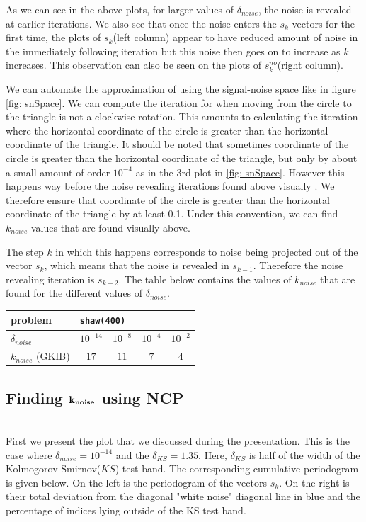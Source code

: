 \documentclass[11pt]{amsart}
\begin{document}
	
	As we can see in the above plots, for larger values of $\delta_{noise}$, the
	noise is revealed at earlier iterations. We also see that once the noise enters
	the $s_k$ vectors for the first time, the plots of $s_k$(left column) appear to have 
	reduced amount of noise in the immediately following iteration but this 
	noise then goes on to increase as $k$ increases. This observation can also be seen on the
	plots of $s_{k}^{no}$(right column).
	
We can automate the approximation of using the signal-noise space like in figure \ref{fig: snSpace}.
We can compute the iteration for when moving from the circle to the triangle is not a clockwise
rotation. This amounts to calculating the iteration where the horizontal coordinate of the circle is greater
than the horizontal coordinate of the triangle. It should be noted that sometimes coordinate of the 
circle is greater than the horizontal coordinate of the triangle, but only by about a small  amount of 
order $10^{-4}$ as in the 3rd plot in \ref{fig: snSpace}.
However this happens way before the noise revealing iterations found above visually . We therefore
ensure that coordinate of the circle is greater than the horizontal coordinate of the triangle by at least 0.1. 
Under this convention, we can find $k_{noise}$ values that are found visually above.

The step $k$ in which this happens corresponds to noise being projected out of the vector $s_k$,
which means that the noise is revealed in $s_{k-1}$. Therefore the noise revealing iteration 
is $s_{k-2}$. The table below contains the values of $k_{noise}$ that are found for the different 
values of $\delta_{noise}$.

\begin{center}
    \begin{tabular}{l||c|c|c|c}
      \multicolumn{1}{l||}{problem} & \multicolumn{4}{l}{\texttt{shaw(400)}} \\
      \hline \hline 
      $\delta_{noise}$ & $10^{-14}$ & $10^{-8}$ & $10^{-4}$ & $10^{-2}$ \\
      \hline
      $k_{noise}$ (GKIB) & $17$ & $11$ & $7$ & $4$ \\
          \end{tabular}
  \end{center}

\subsection{Finding $\bf k_{noise}$ using NCP} \indent \\
First we present the plot that we discussed during the presentation. This is the case where
$\delta_{noise} = 10^{-14}$  and the $\delta_{KS}=1.35$. Here, $\delta_{KS}$ is half of the
width of the Kolmogorov-Smirnov($KS$) test band. The corresponding cumulative periodogram is given below. 
On the left is the periodogram of the vectors $s_k$. On the right is their total deviation from 
the diagonal "white noise" diagonal line in blue and the percentage of indices lying outside of the KS test band.
\end{document}
